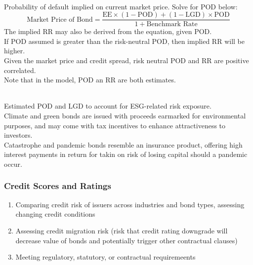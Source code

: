 \begin{remark} \\
Probability of default implied on current market price. Solve for POD below:
\begin{equation}
\text{Market Price of Bond} = \frac{\text{EE} \times (1-\text{POD}) + (1- \text{LGD})\times \text{POD}}{1 + \text{Benchmark Rate}} \nonumber
\end{equation}
The implied RR may also be derived from the equation, given POD.\\
If POD assumed is greater than the risk-neutral POD, then implied RR will be higher.\\
Given the market price and credit spread, risk neutral POD and RR are positive correlated.\\
Note that in the model, POD an RR are both estimates.
\end{remark}

\begin{remark} \\
Estimated POD and LGD to account for ESG-related risk exposure.\\
Climate and green bonds are issued with proceeds earmarked for environmental purposes, and may come with tax incentives to enhance attractiveness to investors.\\
Catastrophe and pandemic bonds resemble an insurance product, offering high interest payments in return for takin on risk of losing capital should a pandemic occur.
\end{remark}

\subsubsection{Credit Scores and Ratings}

\begin{remark} 
\begin{enumerate}[label=\roman*.]
\setlength{\itemsep}{0pt}
\item Comparing credit risk of issuers across industries and bond types, assessing changing credit conditions
\item Assessing credit migration risk (risk that credit rating downgrade will decrease value of bonds and potentially trigger other contractual clauses)
\item Meeting regulatory, statutory, or contractual requiremeents
\end{enumerate}
\end{remark}

